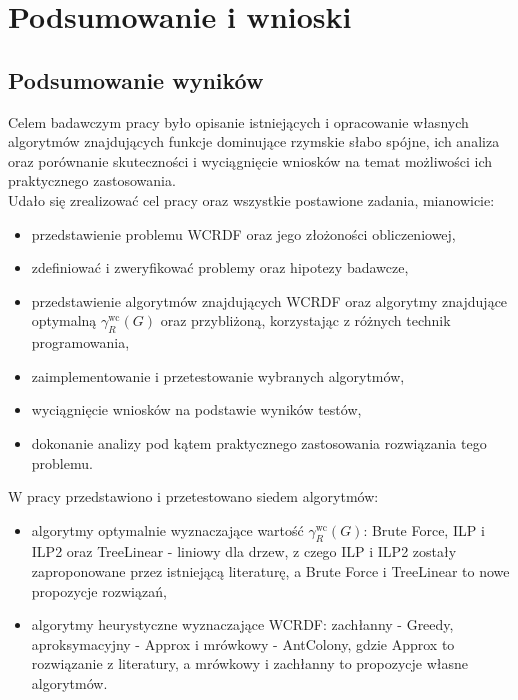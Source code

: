 \chapter{Podsumowanie i wnioski}

\section{Podsumowanie wyników}

Celem badawczym pracy było opisanie istniejących i opracowanie własnych algorytmów znajdujących funkcje dominujące rzymskie słabo spójne, ich analiza oraz porównanie skuteczności i wyciągnięcie wniosków na temat możliwości ich praktycznego zastosowania.\\
Udało się zrealizować cel pracy oraz wszystkie postawione zadania, mianowicie:
\begin{itemize}
    \item przedstawienie problemu WCRDF oraz jego złożoności obliczeniowej,
    \item zdefiniować i zweryfikować problemy oraz hipotezy badawcze,
    \item przedstawienie algorytmów znajdujących WCRDF oraz algorytmy znajdujące optymalną $\gamma^{\text{wc}}_R(G)$ oraz przybliżoną, korzystając z różnych technik programowania,
    \item zaimplementowanie i przetestowanie wybranych algorytmów,
    \item wyciągnięcie wniosków na podstawie wyników testów,
    \item dokonanie analizy pod kątem praktycznego zastosowania rozwiązania tego problemu.
\end{itemize}
W pracy przedstawiono i przetestowano siedem algorytmów:
\begin{itemize}
    \item algorytmy optymalnie wyznaczające wartość $\gamma^{\text{wc}}_R(G)$: Brute Force, ILP i ILP2 oraz TreeLinear - liniowy dla drzew, z czego ILP i ILP2 zostały zaproponowane przez istniejącą literaturę, a Brute Force i TreeLinear to nowe propozycje rozwiązań,
    \item algorytmy heurystyczne wyznaczające WCRDF: zachłanny - Greedy, aproksymacyjny - Approx i mrówkowy - AntColony, gdzie Approx to rozwiązanie z literatury, a mrówkowy i zachłanny to propozycje własne algorytmów.
\end{itemize}

